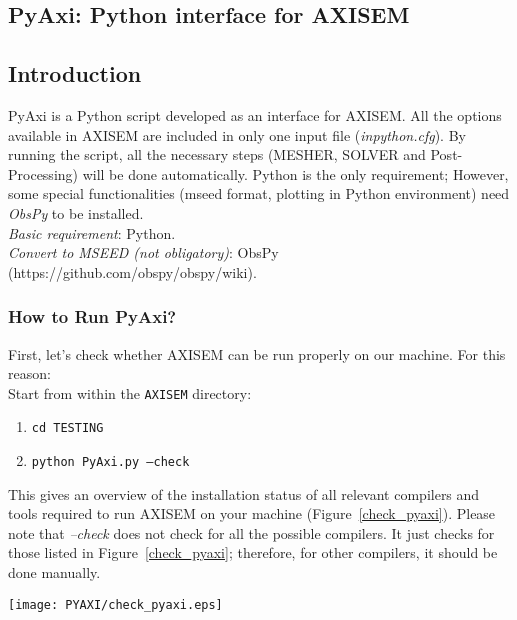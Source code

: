 \subsection{PyAxi: Python interface for AXISEM}

\subsection{Introduction}
PyAxi is a Python script developed as an interface for AXISEM. 
All the options available in AXISEM are included in only one input file (\textit{inpython.cfg}).
By running the script, all the necessary steps (MESHER, SOLVER and Post-Processing) will be done automatically.
Python is the only requirement; However, some special functionalities (mseed format, plotting in Python environment) need \textit{ObsPy} to be installed. \\

\noindent \textit{Basic requirement}: Python.\\
\textit{Convert to MSEED (not obligatory)}: ObsPy (https://github.com/obspy/obspy/wiki).\\

\subsubsection{How to Run PyAxi?}
First, let's check whether AXISEM can be run properly on our machine. 
For this reason:\\

Start from within the {\tt AXISEM} directory:
\begin{enumerate}
\itemsep0em
\item {\tt cd TESTING}
\item {\tt python PyAxi.py --check}
\end{enumerate}
\noindent This gives an overview of the installation status of all relevant compilers and tools required
to run AXISEM on your machine (Figure~\ref{check_pyaxi}). 
Please note that \textit{--check} does not check for all the possible compilers.
It just checks for those listed in Figure~\ref{check_pyaxi}; 
therefore, for other compilers, it should be done manually.\\

\begin{figure*}[htb]
\begin{center}
\texttt{[image: PYAXI/check\_pyaxi.eps]}
\end{center}
\caption{\textit{Checking all the relevant compilers and tools required to run AXISEM.}}
\label{check_pyaxi}
\end{figure*}



